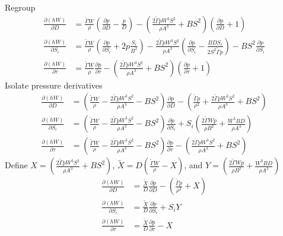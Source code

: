 \documentclass{article}
\begin{document}
Regroup
\begin{align*}
  \frac{\partial (hW)}{\partial D} &= \frac{\widetilde{\Gamma} W}{\rho} \left(\frac{\partial p}{\partial D} - \frac{p}{D}\right) - \left(\frac{2 \widetilde{\Gamma} p W^3 S^2}{\rho A^3} + B S^2 \right) \left(\frac{\partial p}{\partial D} + 1\right)\\
  \frac{\partial (hW)}{\partial S_i} &= \frac{\widetilde{\Gamma} W}{\rho} \left(\frac{\partial p}{\partial S_i} + 2 p \frac{S_i}{B^2}\right) - \frac{2 \widetilde{\Gamma} p W^3 S^{2}}{\rho A^3} \left(\frac{\partial p}{\partial S_i} - \frac{B D S_i}{2 S^{2} \widetilde{\Gamma} p}\right) - B S^2 \frac{\partial p}{\partial S_i}\\
  \frac{\partial (hW)}{\partial \tau} &= \frac{\widetilde{\Gamma} W}{\rho} \frac{\partial p}{\partial \tau} - \left(\frac{2 \widetilde{\Gamma} p W^3 S^2}{\rho A^3} + B S^2\right) \left(\frac{\partial p}{\partial \tau} + 1\right)
\end{align*}
Isolate pressure derivatives
\begin{align*}
  \frac{\partial (hW)}{\partial D} &= \left(\frac{\widetilde{\Gamma} W}{\rho} - \frac{2 \widetilde{\Gamma} p W^3 S^2}{\rho A^3} - B S^2\right)\frac{\partial p}{\partial D} - \left(\frac{\widetilde{\Gamma} p}{\rho^2} + \frac{2 \widetilde{\Gamma} p W^3 S^2}{\rho A^3} + B S^2\right)\\
  \frac{\partial (hW)}{\partial S_i} &= \left(\frac{\widetilde{\Gamma} W}{\rho} - \frac{2 \widetilde{\Gamma} p W^3 S^2}{\rho A^3} - B S^2\right)\frac{\partial p}{\partial S_i} + S_i\left(\frac{2 \widetilde{\Gamma} W p}{\rho B^2} + \frac{W^3B D}{\rho A^3}\right)\\
  \frac{\partial (hW)}{\partial \tau} &= \left(\frac{\widetilde{\Gamma} W}{\rho} - \frac{2 \widetilde{\Gamma} p W^3 S^2}{\rho A^3} - B S^2\right)\frac{\partial p}{\partial \tau} - \left(\frac{2 \widetilde{\Gamma} p W^3 S^2}{\rho A^3} + B S^2\right)
\end{align*}
Define $X = \left(\frac{2 \widetilde{\Gamma} p W^3 S^2}{\rho A^3} + B S^2\right)$, $\widetilde{X} = D\left(\frac{\widetilde{\Gamma} W}{\rho} - X\right)$, and $Y = \left(\frac{2 \widetilde{\Gamma} W p}{\rho B^2} + \frac{W^3B D}{\rho A^3}\right)$
\begin{align*}
  \frac{\partial (hW)}{\partial D} &= \frac{\widetilde{X}}{D}\frac{\partial p}{\partial D} - \left(\frac{\widetilde{\Gamma} p}{\rho^2} + X\right)\\
  \frac{\partial (hW)}{\partial S_i} &= \frac{\widetilde{X}}{D}\frac{\partial p}{\partial S_i} + S_i Y\\
  \frac{\partial (hW)}{\partial \tau} &= \frac{\widetilde{X}}{D}\frac{\partial p}{\partial \tau} - X
\end{align*}
\end{document}
